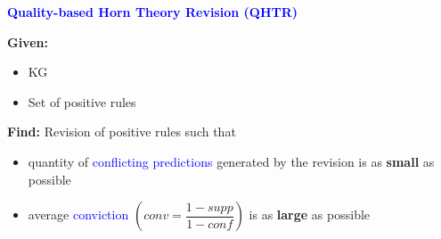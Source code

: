 \documentclass{beamer}
\newcommand{\bl}[1]{\textcolor{blue}{#1}}
\newcommand{\mi}[1]{\ensuremath{\mathit{#1}}}
\begin{document}
\begin{frame}
{\normalsize{\begin{beamerboxesrounded}[upper=uppercolblue,lower=lowercolblue,shadow=true]{\textbf{\bl{Quality-based Horn Theory Revision (QHTR)}}}

\smallskip

\textbf{Given:} 
\begin{itemize}
\item KG
\item Set of positive rules
\end{itemize}

\bigskip
\noindent \textbf{Find:} Revision of positive rules such that

\normalsize{\begin{itemize}

\item quantity of \bl{conflicting predictions} generated by the revision is as \textbf{small} as possible\smallskip

\item average \bl{conviction} $(\mi{conv=\dfrac{1-supp}{1-conf}})$ is as \textbf{large} as possible~\footnotesize{\cite{rulemeasures}}

\end{itemize}}

\end{beamerboxesrounded}}
}

\end{frame}
\end{document}
